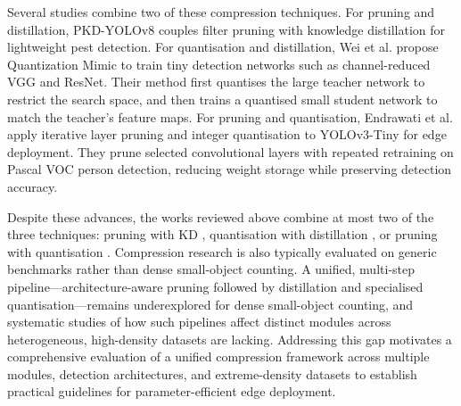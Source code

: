 \begin{sloppypar}
Several studies combine two of these compression techniques. For pruning and distillation, PKD-YOLOv8 \cite{Yu2025_PKD} couples filter pruning with knowledge distillation for lightweight pest detection. For quantisation and distillation, Wei et al. \cite{Wei2018} propose Quantization Mimic to train tiny detection networks such as channel-reduced VGG and ResNet. Their method first quantises the large teacher network to restrict the search space, and then trains a quantised small student network to match the teacher's feature maps. For pruning and quantisation, Endrawati et al. \cite{Endrawati2021} apply iterative layer pruning and integer quantisation to YOLOv3-Tiny for edge deployment. They prune selected convolutional layers with repeated retraining on Pascal VOC person detection, reducing weight storage while preserving detection accuracy.
\end{sloppypar}

Despite these advances, the works reviewed above combine at most two of the three techniques: pruning with KD \cite{Yu2025_PKD}, quantisation with distillation \cite{Wei2018}, or pruning with quantisation \cite{Endrawati2021}. Compression research is also typically evaluated on generic benchmarks rather than dense small-object counting. A unified, multi-step pipeline---architecture-aware pruning followed by distillation and specialised quantisation---remains underexplored for dense small-object counting, and systematic studies of how such pipelines affect distinct modules across heterogeneous, high-density datasets are lacking. Addressing this gap motivates a comprehensive evaluation of a unified compression framework across multiple modules, detection architectures, and extreme-density datasets to establish practical guidelines for parameter-efficient edge deployment.

